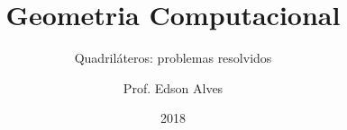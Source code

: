 \title{Geometria Computacional}
\subtitle{Quadriláteros: problemas resolvidos}
\date{2018}
\author{Prof. Edson Alves}
